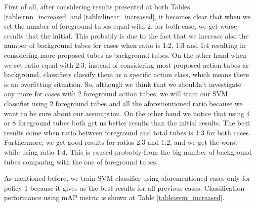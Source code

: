 First of all, after considering results presented at both Tables \ref{table:rnn_increased} and \ref{table:linear_increased}, it becomes clear that when we
set the number of foreground tubes equal with 2, for both case, we get worse results that the initial. This probably is due to the fact that we increase
also the number of background tubes for cases when ratio is 1:2, 1:3 and 1:4 resulting in considering more proposed tubes as background tubes. On the other
hand when we set ratio equal with 2:3, instead of considering most proposed action tubes as background, classifiers classify them as a specific action class,
which means there is an overfitting situation. So, although we think that we shouldn't investigate any more for cases with 2 foreground action tubes,
we will train our SVM classifier using 2 foreground tubes and all the aforementioned ratio because we want to be sure about our assumption. On the other hand
we notice that using 4 or 8 foreground tubes both  get us better results than the initial results. The best results come when  ratio between foreground and
total tubes is 1:3 for both cases. Furthermore, we get good results for ratios 2:3 and 1:2, and we get the worst while using ratio 1:4. This is caused probably
from the big number of background tubes comparing with the one of foreground tubes. \par 
As mentioned before, we train SVM classifier using aforementioned cases only for policy 1 because it gives us the best results for all previous cases.
Classification performance using mAP metric is shown at Table \ref{table:svm_increased}. 

